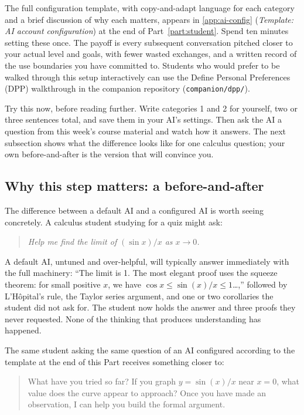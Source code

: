 \documentclass{SIAMbook2023}
\newcommand{\studentprompt}[1]{\begin{quote}\small\itshape #1\end{quote}}
\begin{document}
The full configuration template, with copy-and-adapt language for each category and a brief discussion of why each matters, appears in \cref{app:ai-config} (\emph{Template: AI account configuration}) at the end of Part~\ref{part:student}. Spend ten minutes setting these once. The payoff is every subsequent conversation pitched closer to your actual level and goals, with fewer wasted exchanges, and a written record of the use boundaries you have committed to. Students who would prefer to be walked through this setup interactively can use the Define Personal Preferences (DPP) walkthrough in the companion repository (\texttt{companion/dpp/}).

Try this now, before reading further. Write categories 1 and 2 for yourself, two or three sentences total, and save them in your AI's settings. Then ask the AI a question from this week's course material and watch how it answers. The next subsection shows what the difference looks like for one calculus question; your own before-and-after is the version that will convince you.

\subsection{Why this step matters: a before-and-after}
\label{subsec:config-before-after}

The difference between a default AI and a configured AI is worth seeing concretely. A calculus student studying for a quiz might ask:

\studentprompt{Help me find the limit of $(\sin x)/x$ as $x \to 0$.}

A default AI, untuned and over-helpful, will typically answer immediately with the full machinery: ``The limit is 1. The most elegant proof uses the squeeze theorem: for small positive $x$, we have $\cos x \leq \sin(x)/x \leq 1$\ldots,'' followed by L'H\^{o}pital's rule, the Taylor series argument, and one or two corollaries the student did not ask for. The student now holds the answer and three proofs they never requested. None of the thinking that produces understanding has happened.

The same student asking the same question of an AI configured according to the template at the end of this Part receives something closer to:

\begin{quote}\small\textsf{What have you tried so far? If you graph $y = \sin(x)/x$ near $x = 0$, what value does the curve appear to approach? Once you have made an observation, I can help you build the formal argument.}\end{quote}
\end{document}
